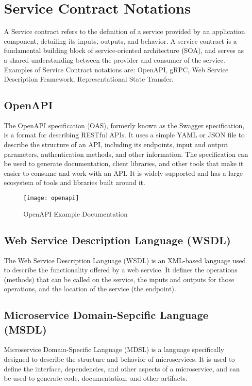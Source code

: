 \section{Service Contract Notations}
A Service contract refers to the definition of a service provided by an application component, detailing its inputs, outputs, and behavior. A service contract is a fundamental building block of service-oriented architecture (SOA), and serves as a shared understanding between the provider and consumer of the service. Examples of Service Contract notations are: OpenAPI, gRPC, Web Service Description Framework, Representational State Transfer.

\subsection{OpenAPI}
The OpenAPI specification (OAS), formerly known as the Swagger specification, is a format for describing RESTful APIs. It uses a simple YAML or JSON file to describe the structure of an API, including its endpoints, input and output parameters, authentication methods, and other information. The specification can be used to generate documentation, client libraries, and other tools that make it easier to consume and work with an API. It is widely supported and has a large ecosystem of tools and libraries built around it.

\begin{figure}[H]
  \center
  \texttt{[image: openapi]}
  \caption{OpenAPI Example Documentation}
\end{figure}

\subsection{Web Service Description Language (WSDL)}
The Web Service Description Language (WSDL) is an XML-based language used to describe the functionality offered by a web service. It defines the operations (methods) that can be called on the service, the inputs and outputs for those operations, and the location of the service (the endpoint). 

\subsection{Microservice Domain-Sepcific Language (MSDL)}
Microservice Domain-Specific Language (MDSL) is a language specifically designed to describe the structure and behavior of microservices. It is used to define the interface, dependencies, and other aspects of a microservice, and can be used to generate code, documentation, and other artifacts.

